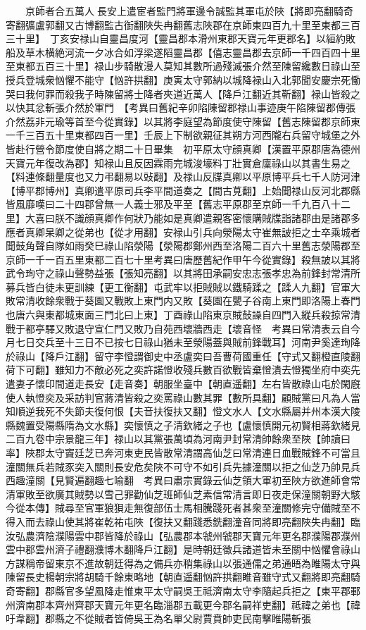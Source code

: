 　　京師者合五萬人長安上遣宦者監門將軍邊令誠監其軍屯於陜【將即亮翻騎奇寄翻彍盧郭翻又古博翻監古衘翻陜失冉翻舊志陜郡在京師東四百九十里至東都三百三十里】　丁亥安禄山自靈昌度河【靈昌郡本滑州東郡天寶元年更郡名】以絙約敗船及草木横絶河流一夕冰合如浮梁遂䧟靈昌郡【僖志靈昌郡去京師一千四百四十里至東都五百三十里】禄山步騎散漫人莫知其數所過殘滅張介然至陳留纔數日祿山至授兵登城衆忷懼不能守【忷許拱翻】庚寅太守郭納以城降禄山入北郭聞安慶宗死慟哭曰我何罪而殺我子時陳留將士降者夾道近萬人【降戶江翻近其靳翻】禄山皆殺之以快其忿斬張介然於軍門　【考異曰舊紀辛卯陷陳留郡禄山事迹庚午陷陳留郡傳張介然荔非元瑜等首至今從實錄】以其將李庭望為節度使守陳留【舊志陳留郡京師東一千三百五十里東都四百一里】壬辰上下制欲親征其朔方河西隴右兵留守城堡之外皆赴行營令節度使自將之期二十日畢集　初平原太守顔真卿【漢置平原郡唐為德州天寶元年復改為郡】知禄山且反因霖雨完城浚壕料丁壯實倉廩祿山以其書生易之【料連條翻量度也又力弔翻易以䜴翻】及禄山反牒真卿以平原博平兵七千人防河津【博平郡博州】真卿遣平原司兵李平間道奏之【間古莧翻】上始聞禄山反河北郡縣皆風靡嘆曰二十四郡曾無一人義士邪及平至【舊志平原郡至京師一千九百八十二里】大喜曰朕不識顔真卿作何狀乃能如是真卿遣親客密懷購賊牒詣諸郡由是諸郡多應者真卿杲卿之從弟也【從才用翻】安禄山引兵向滎陽太守崔無詖拒之士卒乘城者聞鼓角聲自隊如雨癸巳祿山陷滎陽【滎陽郡鄭州西至洛陽二百六十里舊志滎陽郡至京師一千一百五里東都二百七十里考異曰唐歷舊紀作甲午今從實錄】殺無詖以其將武令珣守之祿山聲勢益張【張知亮翻】以其將田承嗣安忠志張孝忠為前鋒封常清所募兵皆白徒未更訓練【更工衡翻】屯武牢以拒賊賊以鐵騎蹂之【蹂人九翻】官軍大敗常清收餘衆戰于葵園又戰敗上東門内又敗【葵園在甖子谷南上東門即洛陽上春門也唐六與東都城東面三門北曰上東】丁酉祿山陷東京賊鼔譟自四門入縱兵殺掠常清戰于都亭驛又敗退守宣仁門又敗乃自苑西壞牆西走【壞音怪　考異曰常清表云自今月七日交兵至十三日不已按七日祿山猶未至滎陽蓋與賊前鋒戰耳】河南尹奚達珣降於祿山【降戶江翻】留守李憕謂御史中丞盧奕曰吾曹荷國重任【守式又翻橙直陵翻荷下可翻】雖知力不敵必死之奕許諾憕收殘兵數百欲戰皆棄憕潰去憕獨坐府中奕先遣妻子懷印間道走長安【走音奏】朝服坐臺中【朝直遥翻】左右皆散祿山屯於閑廐使人執憕奕及采訪判官蔣清皆殺之奕罵祿山數其罪【數所具翻】顧賊黨曰凡為人當知順逆我死不失節夫復何恨【夫音扶復扶又翻】憕文水人【文水縣屬并州本漢大陵縣魏置受陽縣隋為文水縣】奕懷慎之子清欽緒之子也【盧懷慎開元初賢相蔣欽緒見二百九卷中宗景龍三年】禄山以其黨張萬頃為河南尹封常清帥餘衆至陜【帥讀曰率】陜郡太守竇廷芝已奔河東吏民皆散常清謂高仙芝曰常清連日血戰賊鋒不可當且潼關無兵若賊豕突入關則長安危矣陜不可守不如引兵先據潼關以拒之仙芝乃帥見兵西趣潼關【見賢遍翻趣七喻翻　考異曰肅宗實錄云仙芝領大軍初至陜方欲進師會常清軍敗至欲廣其賊勢以雪己罪勸仙芝班師仙芝素信常清言即日夜走保潼關朝野大駭今從本傳】賊尋至官軍狼狽走無復部伍士馬相騰踐死者甚衆至潼關修完守備賊至不得入而去祿山使其將崔乾祐屯陜【復扶又翻踐悉銑翻潼音同將即亮翻陜失冉翻】臨汝弘農濟陰濮陽雲中郡皆降於祿山【弘農郡本虢州虢郡天寶元年更名郡濮陽郡濮州雲中郡雲州濟子禮翻濮博木翻降戶江翻】是時朝廷徵兵諸道皆未至關中忷懼會祿山方謀稱帝留東京不進故朝廷得為之備兵亦稍集祿山以張通儒之弟通晤為睢陽太守與陳留長史楊朝宗將胡騎千餘東略地【朝直遥翻忷許拱翻睢音雖守式又翻將即亮翻騎奇寄翻】郡縣官多望風降走惟東平太守嗣吳王祗濟南太守李隨起兵拒之【東平郡鄆州濟南郡本齊州齊郡天寶元年更名臨淄郡五載更今郡名嗣祥吏翻】祗禕之弟也【禕吁韋翻】郡縣之不從賊者皆倚吳王為名單父尉賈賁帥吏民南擊睢陽斬張
